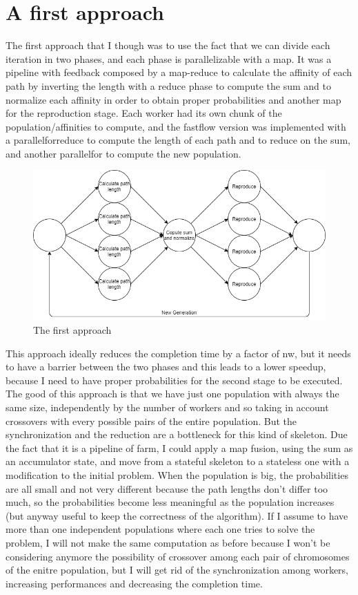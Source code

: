 \documentclass{article}
\begin{document}
    \section{A first approach}\label{sec:s2}
	The first approach that I though was to use the fact that we can divide each iteration in two phases, and each phase is parallelizable with a map. It was a pipeline with feedback composed by a map-reduce to calculate the affinity of each path by inverting the length with a reduce phase to compute the sum and to normalize each affinity in order to obtain proper probabilities and another map for the reproduction stage. Each worker had its own chunk of the population/affinities to compute, and the fastflow version was implemented with a parallelforreduce to compute the length of each path and to reduce on the sum, and another parallelfor to compute the new population.
    \begin{figure}
        \includegraphics[width=\linewidth]{img/first.png}
        \caption{The first approach}
        \label{fig:first}
    \end{figure}
    This approach ideally reduces the completion time by a factor of nw, but it needs to have a barrier between the two phases and this leads to a lower speedup, because I need to have proper probabilities for the second stage to be executed. The good of this approach is that we have just one population with always the same size, independently by the number of workers and so taking in account crossovers with every possible pairs of the entire population. But the synchronization and the reduction are a bottleneck for this kind of skeleton. Due the fact that it is a pipeline of farm, I could apply a map fusion, using the sum as an accumulator state, and move from a stateful skeleton to a stateless one with a modification to the initial problem. When the population is big, the probabilities are all small and not very different because the path lengths don't differ too much, so the probabilities become less meaningful as the population increases (but anyway useful to keep the correctness of the algorithm). If I assume to have more than one independent populations where each one tries to solve the problem, I will not make the same computation as before because I won't be considering anymore the possibility of crossover among each pair of chromosomes of the enitre population, but I will get rid of the synchronization among workers, increasing performances and decreasing the completion time.
\end{document}
